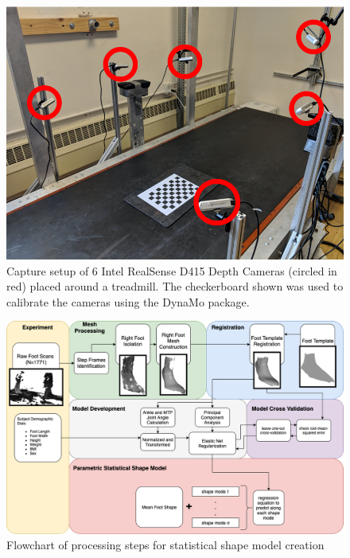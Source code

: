 \documentclass[preprint]{elsarticle}
\begin{document}
\newpage

\begin{figure}
\hypertarget{fig:testSetup}{%
\centering
\includegraphics[width=1\textwidth,height=\textheight]{fig/Fig1.png}
\caption{Capture setup of 6 Intel RealSense D415 Depth Cameras (circled in red) placed around a treadmill. The checkerboard shown was used to calibrate the cameras using the DynaMo package.}\label{fig:testSetup}
}
\end{figure}

\newpage

\begin{figure}
\hypertarget{fig:dataflow}{%
\centering
\includegraphics[width=1\textwidth,height=\textheight]{fig/Fig2.png}
\caption{Flowchart of processing steps for statistical shape model creation}\label{fig:dataflow}
}
\end{figure}
\end{document}
